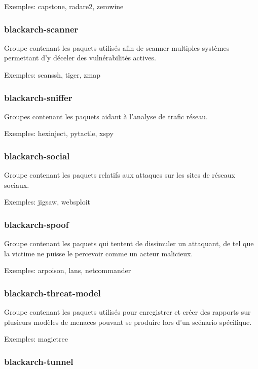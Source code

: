 \documentclass[a4paper, oneside, 11pt]{book}
\begin{document}
Exemples: capstone, radare2, zerowine

\subsubsection{blackarch-scanner}

Groupe contenant les paquets utilis\'{e}s afin de scanner multiples syst\`{e}mes permettant d'y d\'{e}celer des vuln\'{e}rabilit\'{e}s actives.

Exemples: scanssh, tiger, zmap

\subsubsection{blackarch-sniffer}

Groupes contenant les paquets aidant \`{a} l'analyse de trafic r\'{e}seau.

Exemples: hexinject, pytactle, xspy

\subsubsection{blackarch-social}

Groupe contenant les paquets relatifs aux attaques sur les sites de r\'{e}seaux
sociaux.

Exemples: jigsaw, websploit

\subsubsection{blackarch-spoof}

Groupe contenant les paquets qui tentent de dissimuler un attaquant, de tel que
la victime ne puisse le percevoir comme un acteur malicieux.

Exemples: arpoison, lans, netcommander

\subsubsection{blackarch-threat-model}

Groupe contenant les paquets utilis\'{e}s pour enregistrer et cr\'{e}er des rapports sur
plusieurs mod\`{e}les de menaces pouvant se produire lors d'un sc\'{e}nario sp\'{e}cifique.

Exemples: magictree

\subsubsection{blackarch-tunnel}
\end{document}
